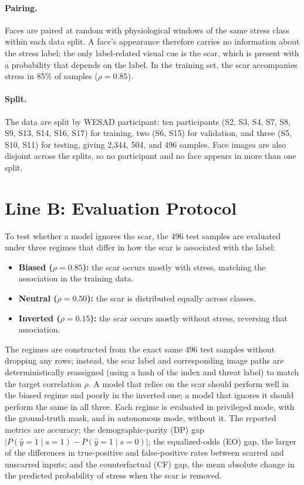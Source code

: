 \paragraph{Pairing.} Faces are paired at random with physiological windows of the same stress class within each data split. A face's appearance therefore carries no information about the stress label; the only label-related visual cue is the scar, which is present with a probability that depends on the label. In the training set, the scar accompanies stress in 85\% of samples ($\rho = 0.85$).

\paragraph{Split.} The data are split by WESAD participant: ten participants (S2, S3, S4, S7, S8, S9, S13, S14, S16, S17) for training, two (S6, S15) for validation, and three (S5, S10, S11) for testing, giving 2,344, 504, and 496 samples. Face images are also disjoint across the splits, so no participant and no face appears in more than one split.

\section{Line B: Evaluation Protocol}
\label{sec:lineB_protocol}
To test whether a model ignores the scar, the 496 test samples are evaluated under three regimes that differ in how the scar is associated with the label:
\begin{itemize}
    \item \textbf{Biased ($\rho = 0.85$):} the scar occurs mostly with stress, matching the association in the training data.
    \item \textbf{Neutral ($\rho = 0.50$):} the scar is distributed equally across classes.
    \item \textbf{Inverted ($\rho = 0.15$):} the scar occurs mostly without stress, reversing that association.
\end{itemize}
The regimes are constructed from the exact same 496 test samples without dropping any rows; instead, the scar label and corresponding image paths are deterministically reassigned (using a hash of the index and threat label) to match the target correlation $\rho$.
A model that relies on the scar should perform well in the biased regime and poorly in the inverted one; a model that ignores it should perform the same in all three. Each regime is evaluated in privileged mode, with the ground-truth mask, and in autonomous mode, without it. The reported metrics are accuracy; the demographic-parity (DP) gap $|P(\hat{y}=1 \mid s=1) - P(\hat{y}=1 \mid s=0)|$; the equalized-odds (EO) gap, the larger of the differences in true-positive and false-positive rates between scarred and unscarred inputs; and the counterfactual (CF) gap, the mean absolute change in the predicted probability of stress when the scar is removed.

